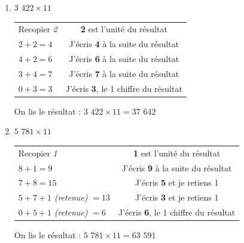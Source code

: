 \documentclass[a4paper]{article}
\begin{document}
\begin{small}
\begin{enumerate}

	\item $3$ $422 \times 11$
	
	\begin{tabular}{l|c}

		Recopier \textit{2} & \textbf{2} est l'unité du résultat
		
		\tabularnewline
		
		$2 + 2 = 4$ & J'écris \textbf{4} à la suite du résultat
		
		\tabularnewline
		
		$4 + 2 = 6$ & J'écris \textbf{6} à la suite du résultat
		
		\tabularnewline
		
		$3 + 4 = 7$ & J'écris \textbf{7} à la suite du résultat
		
		\tabularnewline
		
		$0 + 3 = 3$ & J'écris \textbf{3}, le 1\up{er} chiffre du résultat

	\end{tabular}	
	
	On lis le résultat : {\boldmath $3$ $422 \times 11 = 37$ $642$}\\	
	
	
	
	
	
	\item $5$ $781 \times 11$
	
	\begin{tabular}{l|c}

		Recopier \textit{1} & \textbf{1} est l'unité du résultat
		
		\tabularnewline
		
		$8 + 1 = 9$ & J'écris \textbf{9} à la suite du résultat
		
		\tabularnewline
		
		$7 + 8 = 15$ & J'écris \textbf{5} et je retiens 1
		
		\tabularnewline
		
		$5 + 7 + 1$ \textit{(retenue)} $= 13$ & J'écris \textbf{3} et je retiens 1
		
		\tabularnewline
		
		$0 + 5 + 1$ \textit{(retenue)} $= 6$ & J'écris \textbf{6}, le 1\up{er} chiffre du résultat
		
	\end{tabular}
	
	On lis le résultat : {\boldmath $5$ $781 \times 11 = 63$ $591$}\\

\end{enumerate}
\end{small}
\end{document}
